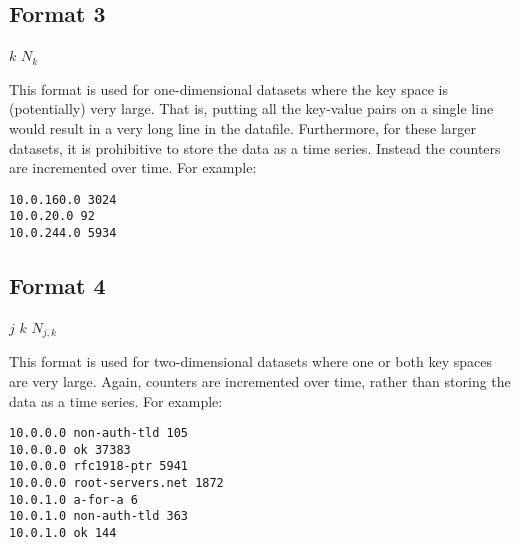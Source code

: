 \documentclass{report}
\begin{document}
\subsection{Format 3}

\noindent
\begin{tt}$k$ $N_{k}$
\end{tt}

\vspace{1ex}\noindent
This format is used for one-dimensional datasets where the key space
is (potentially) very large.  That is, putting all the key-value pairs
on a single line would result in a very long line in the datafile.
Furthermore, for these larger datasets, it is prohibitive to
store the data as a time series.  Instead the counters are incremented
over time.  For example:

\begin{verbatim}
10.0.160.0 3024
10.0.20.0 92
10.0.244.0 5934
\end{verbatim}

\subsection{Format 4}

\noindent
\begin{tt}$j$ $k$ $N_{j,k}$
\end{tt}

\vspace{1ex}\noindent
This format is used for two-dimensional datasets where one or both
key spaces are very large.  Again, counters are incremented over
time, rather than storing the data as a time series.
For example:

\begin{verbatim}
10.0.0.0 non-auth-tld 105
10.0.0.0 ok 37383
10.0.0.0 rfc1918-ptr 5941
10.0.0.0 root-servers.net 1872
10.0.1.0 a-for-a 6
10.0.1.0 non-auth-tld 363
10.0.1.0 ok 144
\end{verbatim}
\end{document}
